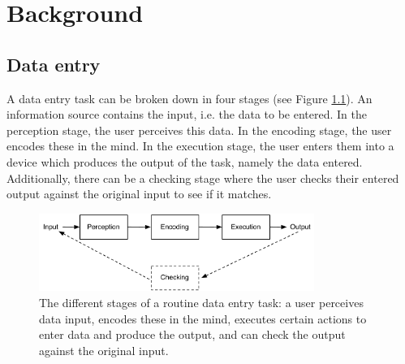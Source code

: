 \documentclass[11pt,oneside]{report}
\begin{document}
\chapter{Background}\label{ch:Background}

\section{Data entry}
A data entry task can be broken down in four stages (see Figure \ref{fig:ch2_hip}). An information source contains the input, i.e. the data to be entered. In the perception stage, the user perceives this data. In the encoding stage, the user encodes these in the mind. In the execution stage, the user enters them into a device which produces the output of the task, namely the data entered. Additionally, there can be a checking stage where the user checks their entered output against the original input to see if it matches.

\begin{figure}[!ht]
\centering
\includegraphics[width=0.8\textwidth]{images/HIP.pdf}
\caption{The different stages of a routine data entry task: a user perceives data input, encodes these in the mind, executes certain actions to enter data and produce the output, and can check the output against the original input.}
\vspace{-3pt}
\label{fig:ch2_hip}
\end{figure}
\end{document}
